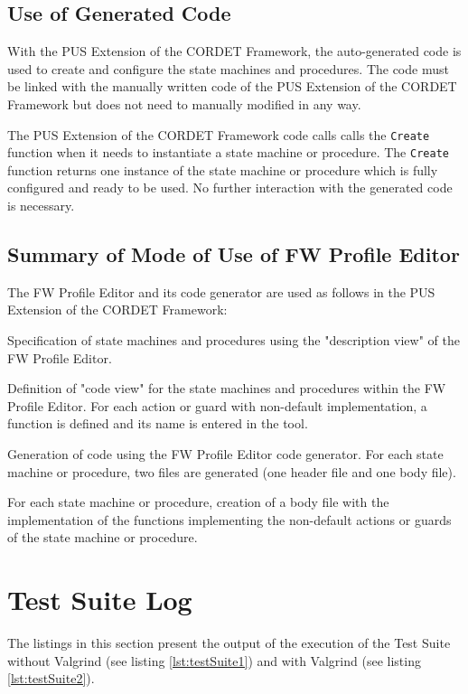 \documentclass{pnp_article}
\begin{document}
\subsection{Use of Generated Code}
With the PUS Extension of the CORDET Framework, the auto-generated code is used to create and configure the state machines and procedures. The code must be linked with the manually written code of the PUS Extension of the CORDET Framework but does not need to manually modified in any way.  

The PUS Extension of the CORDET Framework code calls calls the \texttt{Create} function when it needs to instantiate a state machine or procedure. The \texttt{Create} function returns one instance of the state machine or procedure which is fully configured and ready to be used. No further interaction with the generated code is necessary.

\subsection{Summary of Mode of Use of FW Profile Editor}
The FW Profile Editor and its code generator are used as follows in the PUS Extension of the CORDET Framework:

\begin{fw_enumerate}
\item Specification of state machines and procedures using the "description view" of the FW Profile Editor. 
\item Definition of "code view" for the state machines and procedures within the FW Profile Editor. For each action or guard with non-default implementation, a function is defined and its name is entered in the tool. 
\item Generation of code using the FW Profile Editor code generator. For each state machine or procedure, two files are generated (one header file and one body file).
\item For each state machine or procedure, creation of a body file with the implementation of the functions implementing the non-default actions or guards of the state machine or procedure.
\end{fw_enumerate}


\section{Test Suite Log}\label{sec:testSuiteLog}
The listings in this section present the output of the execution of the Test Suite without Valgrind (see listing \ref{lst:testSuite1}) and with Valgrind (see listing \ref{lst:testSuite2}).



\newpage

\end{document}
